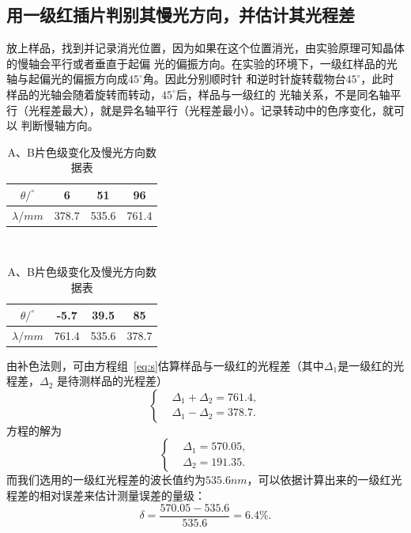\documentclass[11pt,a4paper]{article}
\begin{document}
\begin{spacing}{1.3}
\begin{CJK*}{UTF8}{gbsn}
\subsection{用一级红插片判别其慢光方向，并估计其光程差}
放上样品，找到并记录消光位置，因为如果在这个位置消光，由实验原理可知晶体的慢轴会平行或者垂直于起偏
光的偏振方向。在实验的环境下，一级红样品的光轴与起偏光的偏振方向成$45^{\circ}$角。因此分别顺时针
和逆时针旋转载物台$45^{\circ}$，此时样品的光轴会随着旋转而转动，$45^{\circ}$后，样品与一级红的
光轴关系，不是同名轴平行（光程差最大），就是异名轴平行（光程差最小）。记录转动中的色序变化，就可以
判断慢轴方向。
\begin{table}
\caption{A、B片色级变化及慢光方向数据表}
\begin{center}
\begin{tabular}{c|c|c|c}
\hline 
\rule[-1ex]{0pt}{2.5ex} $\theta/^{\circ}$ & 6 & 51 & 96 \\ 
\hline 
\rule[-1ex]{0pt}{2.5ex} $\lambda/mm$ & 378.7 & 535.6 & 761.4 \\ 
\hline 
\end{tabular} \\
\begin{tabular}{c|c|c|c}
\hline 
\rule[-1ex]{0pt}{2.5ex} $\theta/^{\circ}$ & -5.7 & 39.5 & 85 \\ 
\hline 
\rule[-1ex]{0pt}{2.5ex} $\lambda/mm$ & 761.4 & 535.6 & 378.7 \\ 
\hline 
\end{tabular} 
\end{center}
\end{table}
由补色法则，可由方程组~\eqref{eq:s}估算样品与一级红的光程差（其中$\Delta_1$是一级红的光程差，$\Delta_2$
是待测样品的光程差）
\begin{equation}
\begin{cases} 
&\Delta_1+\Delta_2=761.4,\\
&\Delta_1-\Delta_2=378.7.\label{eq:s}
\end{cases}
\end{equation}
方程的解为
\begin{equation}
\begin{cases} 
&\Delta_1=570.05,\\
&\Delta_2=191.35.
\end{cases}
\end{equation}
而我们选用的一级红光程差的波长值约为$535.6nm$，可以依据计算出来的一级红光程差的相对误差来估计测量误差的量级：
\begin{equation}
\delta=\frac{570.05-535.6}{535.6} = 6.4\%.
\end{equation}

\end{CJK*}
\end{spacing}
\end{document}
